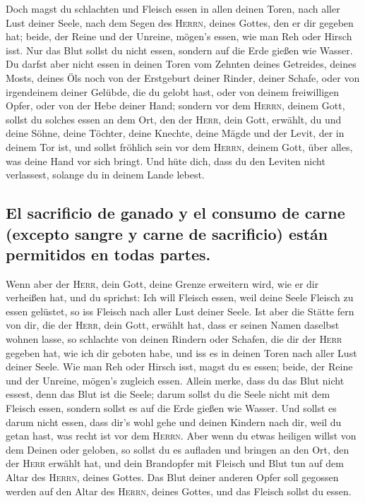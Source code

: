  Doch magst du schlachten und Fleisch essen in allen
deinen Toren, nach aller Lust deiner Seele, nach dem Segen des
\textsc{Herrn}, deines Gottes, den er dir gegeben hat; beide, der Reine
und der Unreine, mögen's essen, wie man Reh oder Hirsch isst.
 Nur das Blut sollst du nicht essen, sondern auf die Erde
gießen wie Wasser.  Du darfst aber nicht essen in deinen
Toren vom Zehnten deines Getreides, deines Mosts, deines Öls noch von
der Erstgeburt deiner Rinder, deiner Schafe, oder von irgendeinem deiner
Gelübde, die du gelobt hast, oder von deinem freiwilligen Opfer, oder
von der Hebe deiner Hand;  sondern vor dem
\textsc{Herrn}, deinem Gott, sollst du solches essen an dem Ort, den der
\textsc{Herr}, dein Gott, erwählt, du und deine Söhne, deine Töchter,
deine Knechte, deine Mägde und der Levit, der in deinem Tor ist, und
sollst fröhlich sein vor dem \textsc{Herrn}, deinem Gott, über alles,
was deine Hand vor sich bringt.  Und hüte dich, dass du
den Leviten nicht verlassest, solange du in deinem Lande lebest.

\hypertarget{el-sacrificio-de-ganado-y-el-consumo-de-carne-excepto-sangre-y-carne-de-sacrificio-estuxe1n-permitidos-en-todas-partes.}{%
\subsection{El sacrificio de ganado y el consumo de carne (excepto
sangre y carne de sacrificio) están permitidos en todas
partes.}\label{el-sacrificio-de-ganado-y-el-consumo-de-carne-excepto-sangre-y-carne-de-sacrificio-estuxe1n-permitidos-en-todas-partes.}}

 Wenn aber der \textsc{Herr}, dein Gott, deine Grenze
erweitern wird, wie er dir verheißen hat, und du sprichst: Ich will
Fleisch essen, weil deine Seele Fleisch zu essen gelüstet, so iss
Fleisch nach aller Lust deiner Seele.  Ist aber die
Stätte fern von dir, die der \textsc{Herr}, dein Gott, erwählt hat, dass
er seinen Namen daselbst wohnen lasse, so schlachte von deinen Rindern
oder Schafen, die dir der \textsc{Herr} gegeben hat, wie ich dir geboten
habe, und iss es in deinen Toren nach aller Lust deiner Seele.
 Wie man Reh oder Hirsch isst, magst du es essen; beide,
der Reine und der Unreine, mögen's zugleich essen. 
Allein merke, dass du das Blut nicht essest, denn das Blut ist die
Seele; darum sollst du die Seele nicht mit dem Fleisch essen,
 sondern sollst es auf die Erde gießen wie Wasser.
 Und sollst es darum nicht essen, dass dir's wohl gehe
und deinen Kindern nach dir, weil du getan hast, was recht ist vor dem
\textsc{Herrn}.  Aber wenn du etwas heiligen willst von
dem Deinen oder geloben, so sollst du es aufladen und bringen an den
Ort, den der \textsc{Herr} erwählt hat,  und dein
Brandopfer mit Fleisch und Blut tun auf dem Altar des \textsc{Herrn},
deines Gottes. Das Blut deiner anderen Opfer soll gegossen werden auf
den Altar des \textsc{Herrn}, deines Gottes, und das Fleisch sollst du
essen.

